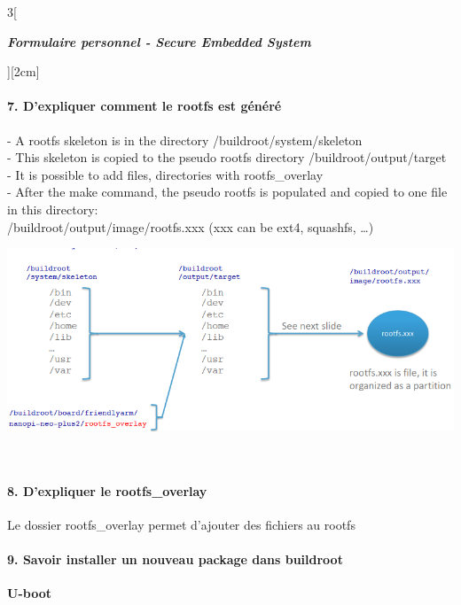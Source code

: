 \begin{multicols}{3}[\centerline{ \large\em \textbf{Formulaire personnel - Secure Embedded System}}][2cm]
\paragraph*{7. D’expliquer comment le rootfs est généré\\}
- A rootfs skeleton is in the directory /buildroot/system/skeleton\\
- This skeleton is copied to the pseudo rootfs directory /buildroot/output/target\\
- It is possible to add files, directories with rootfs\_overlay\\
- After the make command, the pseudo rootfs is populated and copied to one file in this directory: \\
/buildroot/output/image/rootfs.xxx (xxx can be ext4,
squashfs, …)\\
\begin{minipage}{\linewidth}
	\centering
    \includegraphics[width =0.8\columnwidth]{images/6.png}
\end{minipage}\\
\paragraph*{8. D’expliquer le rootfs\_overlay\\}
Le dossier rootfs\_overlay permet d’ajouter des fichiers
au rootfs
\paragraph*{9. Savoir installer un nouveau package dans buildroot\\}


{\Large \textbf{U-boot}}\\

\end{multicols}
